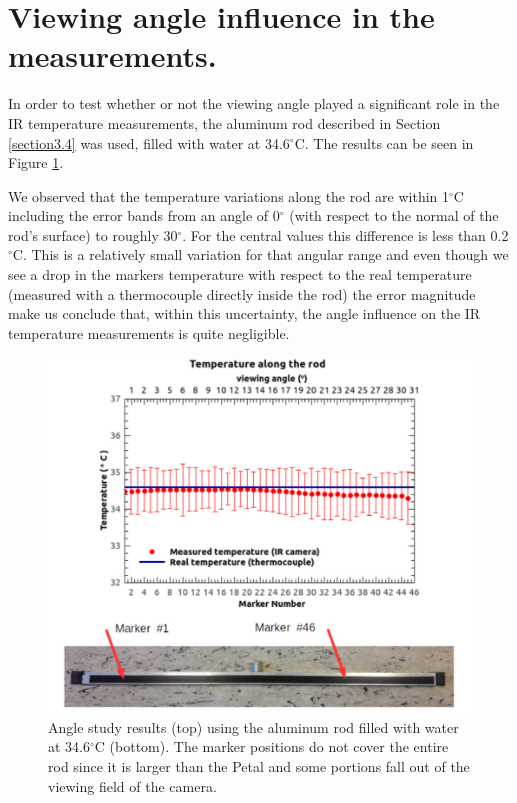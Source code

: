 	\section{Viewing angle influence in the measurements.}\label{section4.5}
	
		In order to test whether or not the viewing angle played a significant role in the IR temperature measurements, the aluminum rod described in Section \ref{section3.4} was used, filled with water at 34.6\space$^{\circ}$C. The results can be seen in Figure \ref{fig4.8}. 
		
		We observed that the temperature variations along the rod are within 1\space$^{\circ}$C including the error bands from an angle of 0$^\circ$ (with respect to the normal of the rod’s surface) to roughly 30$^\circ$. For the central values this difference is less than 0.2\space$^{\circ}$C. This is a relatively small variation for that angular range and even though we see a drop in the markers temperature with respect to the real temperature (measured with a thermocouple directly inside the rod) the error magnitude make us conclude that, within this uncertainty, the angle influence on the IR temperature measurements is quite negligible.
		
		\begin{figure}[ht!]
			\centering
			\captionsetup{justification=centering,margin=0cm}
			\includegraphics[scale=0.4]{Figures/Chapter04/RodAngularTempResults.jpg}
			\caption{Angle study results (top) using the aluminum rod filled with water at 34.6\space$^{\circ}$C (bottom). The marker positions do not cover the entire rod since it is larger than the Petal and some portions fall out of the viewing field of the camera.}\label{fig4.8}
		\end{figure}
	
	
